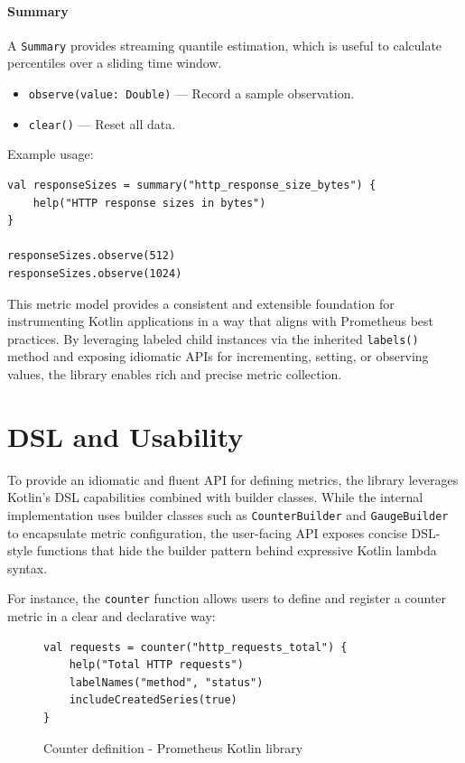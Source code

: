 \paragraph{Summary}

A \texttt{Summary} provides streaming quantile estimation, which is useful to calculate percentiles over a sliding time window.

\begin{itemize}
    \item \texttt{observe(value: Double)} — Record a sample observation.
    \item \texttt{clear()} — Reset all data.
\end{itemize}

Example usage:

\begin{lstlisting}
val responseSizes = summary("http_response_size_bytes") {
    help("HTTP response sizes in bytes")
}

responseSizes.observe(512)
responseSizes.observe(1024)
\end{lstlisting}

This metric model provides a consistent and extensible foundation for instrumenting Kotlin applications in a way that aligns with Prometheus best practices.
By leveraging labeled child instances via the inherited \texttt{labels()} method and exposing idiomatic APIs for incrementing, setting, or observing values, the library enables rich and precise metric collection.

\section{DSL and Usability}\label{sec:dsl-and-usability}

To provide an idiomatic and fluent \ac{API} for defining metrics, the library leverages Kotlin’s \ac{DSL} capabilities
combined with builder classes.
While the internal implementation uses builder classes such as \texttt{CounterBuilder} and \texttt{GaugeBuilder} to
encapsulate metric configuration, the user-facing \ac{API} exposes concise \ac{DSL}-style functions that hide the
builder pattern behind expressive Kotlin lambda syntax.

For instance, the \texttt{counter} function allows users to define and register a counter metric in a clear and declarative way:

\begin{figure}[h]
    \begin{lstlisting}
val requests = counter("http_requests_total") {
    help("Total HTTP requests")
    labelNames("method", "status")
    includeCreatedSeries(true)
}
    \end{lstlisting}
    \caption{Counter definition - Prometheus Kotlin library}
\end{figure}

